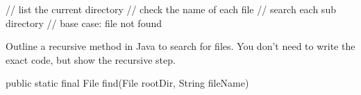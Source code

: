 \begin{answer}
// list the current directory
// check the name of each file
// search each sub directory
// base case: file not found
\end{answer}


\Q Outline a recursive method in Java to search for files.
You don't need to write the exact code, but show the recursive step.

\begin{javalst}
public static final File find(File rootDir, String fileName) {












}
\end{javalst}
